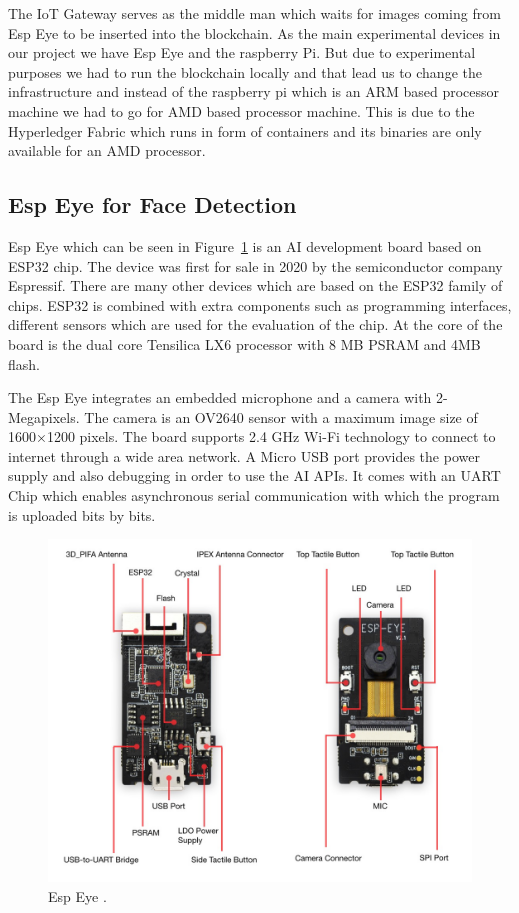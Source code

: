 The IoT Gateway serves as the middle man which waits for images coming from Esp Eye to be inserted into the blockchain. As the main experimental devices in our project we have Esp Eye and the raspberry Pi. But due to experimental purposes we had to run the blockchain locally and that lead us to change the infrastructure and instead of the raspberry pi which is an ARM based processor machine we had to go for AMD based processor machine. This is due to the Hyperledger Fabric which runs in form of containers and its binaries are only available for an AMD processor. 


\subsection{Esp Eye for Face Detection}

Esp Eye which can be seen in Figure~\ref{fig:espeye} is an AI development board based on ESP32 chip. The device was first for sale in 2020 by the semiconductor company Espressif. There are many other devices which are based on the ESP32 family of chips. ESP32 is combined with extra components such as programming interfaces, different sensors which are used for the evaluation of the chip. 
At the core of the board is the dual core Tensilica LX6 processor with 8 MB PSRAM and 4MB flash. 

The Esp Eye integrates an embedded microphone and a camera with 2-Megapixels. The camera is an OV2640 sensor with a maximum image size of 1600×1200 pixels. The board supports  2.4 GHz Wi-Fi technology to connect to internet through a wide area network. A Micro USB port provides the power supply and also debugging in order to use the AI APIs. It comes with an UART Chip which enables asynchronous serial communication with which the program is uploaded bits by bits. 
\begin{figure}[!htb]
    \centering
    \includegraphics[width=1\textwidth]{figures/espeye.png}
    \caption{Esp Eye \cite{espeyeimage}.}
    \label{fig:espeye}
\end{figure}


